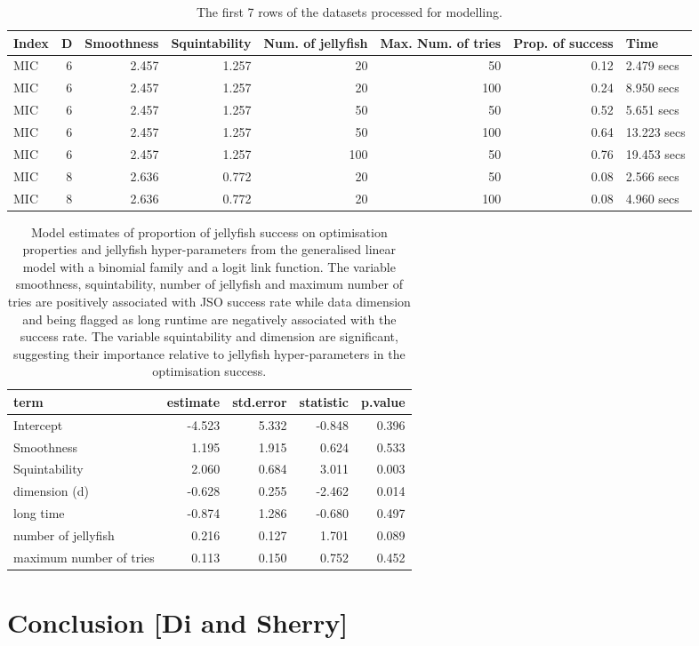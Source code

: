 \documentclass[
  number,
  preprint,
  3p]{elsarticle}
\begin{document}
\begingroup\fontsize{7}{9}\selectfont

\hypertarget{tbl-mod-data}{}
\begin{longtable}[t]{lrrrrrrl}
\caption{\label{tbl-mod-data}The first 7 rows of the datasets processed for modelling. }\tabularnewline

\toprule
Index & D & Smoothness & Squintability & Num. of jellyfish & Max. Num. of tries & Prop. of success & Time\\
\midrule
MIC & 6 & 2.457 & 1.257 & 20 & 50 & 0.12 & 2.479 secs\\
MIC & 6 & 2.457 & 1.257 & 20 & 100 & 0.24 & 8.950 secs\\
MIC & 6 & 2.457 & 1.257 & 50 & 50 & 0.52 & 5.651 secs\\
MIC & 6 & 2.457 & 1.257 & 50 & 100 & 0.64 & 13.223 secs\\
MIC & 6 & 2.457 & 1.257 & 100 & 50 & 0.76 & 19.453 secs\\
\addlinespace
MIC & 8 & 2.636 & 0.772 & 20 & 50 & 0.08 & 2.566 secs\\
MIC & 8 & 2.636 & 0.772 & 20 & 100 & 0.08 & 4.960 secs\\
\bottomrule
\end{longtable}
\endgroup{}

\begingroup\fontsize{7}{9}\selectfont

\hypertarget{tbl-mod-output}{}
\begin{longtable}[t]{|>{}lrrr>{}r|}
\caption{\label{tbl-mod-output}Model estimates of proportion of jellyfish success on optimisation
properties and jellyfish hyper-parameters from the generalised linear
model with a binomial family and a logit link function. The variable
smoothness, squintability, number of jellyfish and maximum number of
tries are positively associated with JSO success rate while data
dimension and being flagged as long runtime are negatively associated
with the success rate. The variable squintability and dimension are
significant, suggesting their importance relative to jellyfish
hyper-parameters in the optimisation success. }\tabularnewline

\toprule
term & estimate & std.error & statistic & p.value\\
\midrule
Intercept & -4.523 & 5.332 & -0.848 & 0.396\\
Smoothness & 1.195 & 1.915 & 0.624 & 0.533\\
Squintability & 2.060 & 0.684 & 3.011 & 0.003\\
dimension (d) & -0.628 & 0.255 & -2.462 & 0.014\\
long time & -0.874 & 1.286 & -0.680 & 0.497\\
\addlinespace
number of jellyfish & 0.216 & 0.127 & 1.701 & 0.089\\
maximum number of tries & 0.113 & 0.150 & 0.752 & 0.452\\
\bottomrule
\end{longtable}
\endgroup{}

\hypertarget{sec-conclusion}{%
\section{Conclusion {[}Di and Sherry{]}}\label{sec-conclusion}}


\renewcommand\refname{References}
  
\end{document}
